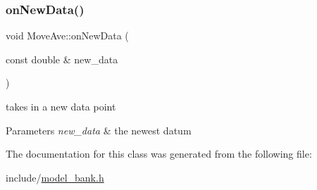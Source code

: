 \mbox{\label{classMoveAve_aedeb10294b2e248f27deb43e30b4a1fc}} 
\subsubsection{\texorpdfstring{on\+New\+Data()}{onNewData()}}
{\footnotesize\ttfamily void Move\+Ave\+::on\+New\+Data (\begin{DoxyParamCaption}\item[{const double \&}]{new\+\_\+data }\end{DoxyParamCaption})}



takes in a new data point 


\begin{DoxyParams}{Parameters}
{\em new\+\_\+data} & the newest datum \\
\hline
\end{DoxyParams}


The documentation for this class was generated from the following file\+:\begin{DoxyCompactItemize}
\item 
include/\hyperlink{model__bank_8h}{model\+\_\+bank.\+h}\end{DoxyCompactItemize}
